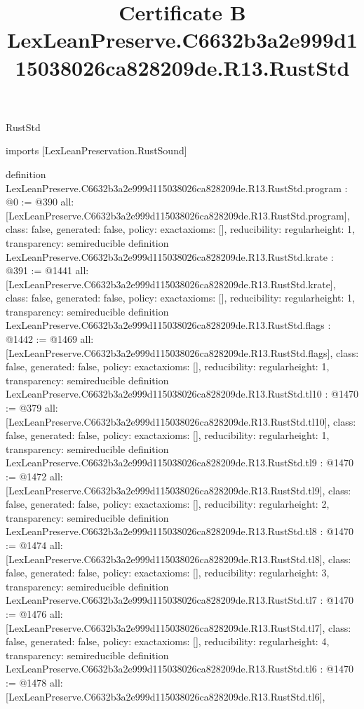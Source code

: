 \begin{lexlean}{RustStd}
\title{Certificate B LexLeanPreserve.C6632b3a2e999d115038026ca828209de.R13.RustStd}
\begin{coremodule}
imports [LexLeanPreservation.RustSound]

definition LexLeanPreserve.C6632b3a2e999d115038026ca828209de.R13.RustStd.program : @0 := @390 {
  all: [LexLeanPreserve.C6632b3a2e999d115038026ca828209de.R13.RustStd.program],
  class: false,
  generated: false,
  policy: exact{axioms: []},
  reducibility: regular{height: 1},
  transparency: semireducible
}
definition LexLeanPreserve.C6632b3a2e999d115038026ca828209de.R13.RustStd.krate : @391 := @1441 {
  all: [LexLeanPreserve.C6632b3a2e999d115038026ca828209de.R13.RustStd.krate],
  class: false,
  generated: false,
  policy: exact{axioms: []},
  reducibility: regular{height: 1},
  transparency: semireducible
}
definition LexLeanPreserve.C6632b3a2e999d115038026ca828209de.R13.RustStd.flags : @1442 := @1469 {
  all: [LexLeanPreserve.C6632b3a2e999d115038026ca828209de.R13.RustStd.flags],
  class: false,
  generated: false,
  policy: exact{axioms: []},
  reducibility: regular{height: 1},
  transparency: semireducible
}
definition LexLeanPreserve.C6632b3a2e999d115038026ca828209de.R13.RustStd.tl10 : @1470 := @379 {
  all: [LexLeanPreserve.C6632b3a2e999d115038026ca828209de.R13.RustStd.tl10],
  class: false,
  generated: false,
  policy: exact{axioms: []},
  reducibility: regular{height: 1},
  transparency: semireducible
}
definition LexLeanPreserve.C6632b3a2e999d115038026ca828209de.R13.RustStd.tl9 : @1470 := @1472 {
  all: [LexLeanPreserve.C6632b3a2e999d115038026ca828209de.R13.RustStd.tl9],
  class: false,
  generated: false,
  policy: exact{axioms: []},
  reducibility: regular{height: 2},
  transparency: semireducible
}
definition LexLeanPreserve.C6632b3a2e999d115038026ca828209de.R13.RustStd.tl8 : @1470 := @1474 {
  all: [LexLeanPreserve.C6632b3a2e999d115038026ca828209de.R13.RustStd.tl8],
  class: false,
  generated: false,
  policy: exact{axioms: []},
  reducibility: regular{height: 3},
  transparency: semireducible
}
definition LexLeanPreserve.C6632b3a2e999d115038026ca828209de.R13.RustStd.tl7 : @1470 := @1476 {
  all: [LexLeanPreserve.C6632b3a2e999d115038026ca828209de.R13.RustStd.tl7],
  class: false,
  generated: false,
  policy: exact{axioms: []},
  reducibility: regular{height: 4},
  transparency: semireducible
}
definition LexLeanPreserve.C6632b3a2e999d115038026ca828209de.R13.RustStd.tl6 : @1470 := @1478 {
  all: [LexLeanPreserve.C6632b3a2e999d115038026ca828209de.R13.RustStd.tl6],
}
\end{coremodule}
\end{lexlean}
